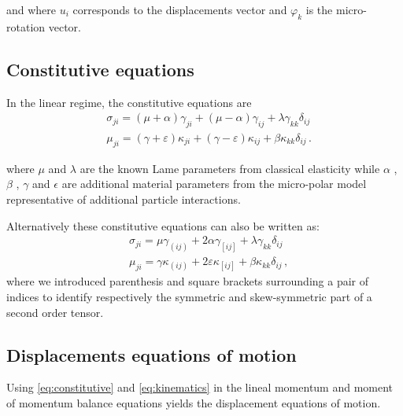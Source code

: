 \documentclass[12pt]{article}
\begin{document}
and where $u_i$ corresponds to the displacements vector and $\varphi_k$ is the micro-rotation vector.

\subsection{Constitutive equations}
In the linear regime, the constitutive equations are
\begin{subequations}\label{eq:constitutive}
  \begin{align}
    & \sigma_{ji} = (\mu + \alpha) \gamma_{ji} + (\mu - \alpha) \gamma_{ij} + \lambda \gamma_{kk} \delta_{ij}\\
    & \mu_{ji} = (\gamma + \varepsilon) \kappa_{ji} + (\gamma - \varepsilon) \kappa_{ij} + \beta \kappa_{kk} \delta_{ij}\, .
  \end{align}
\end{subequations}

where $\mu$ and $\lambda$ are the known Lame parameters from classical elasticity while $\alpha$ , $\beta$ , $\gamma$ and $\epsilon$ are additional material parameters from the micro-polar model representative of additional particle interactions.

Alternatively these constitutive equations can also be written as:
\begin{align*}
    & \sigma_{ji} = \mu \gamma_{(ij)} + 2 \alpha \gamma_{[ij]} + \lambda \gamma_{kk} \delta_{ij}\\
    & \mu_{ji} = \gamma \kappa_{(ij)} + 2\varepsilon \kappa_{[ij]} + \beta \kappa_{kk} \delta_{ij}\, ,
\end{align*}
where we introduced parenthesis and square brackets surrounding a pair of indices to identify respectively the symmetric and skew-symmetric part of a second order tensor. 

\subsection{Displacements equations of motion}
Using \eqref{eq:constitutive} and \eqref{eq:kinematics} in the lineal momentum and moment of momentum balance equations yields the displacement equations of motion.
\end{document}
